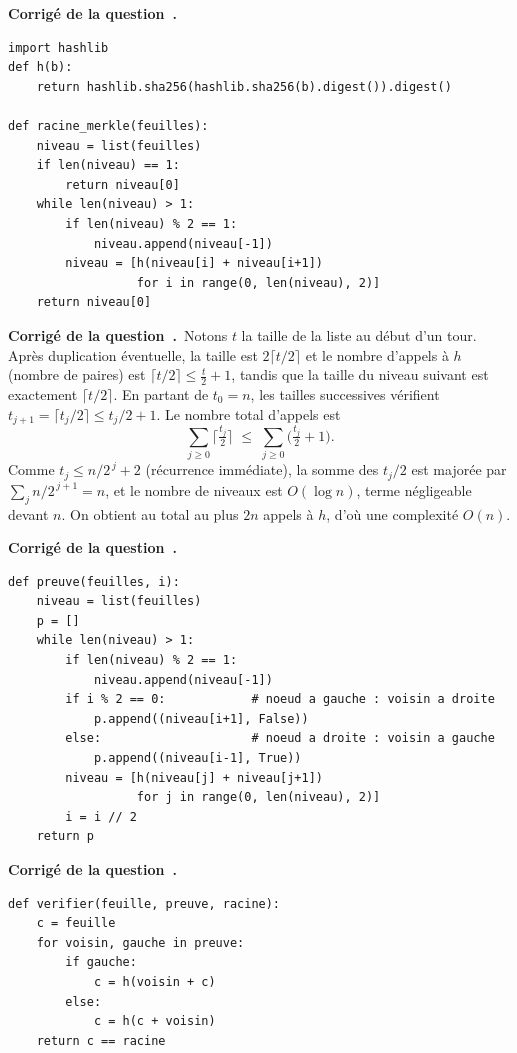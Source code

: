 \documentclass[11pt,a4paper]{article}
\newcounter{qcnt}
\newcommand{\Q}{\medskip\par\stepcounter{qcnt}\noindent\textbf{Corrigé de la question~\theqcnt.}~}
\begin{document}
\Q
\begin{lstlisting}
import hashlib
def h(b):
    return hashlib.sha256(hashlib.sha256(b).digest()).digest()

def racine_merkle(feuilles):
    niveau = list(feuilles)
    if len(niveau) == 1:
        return niveau[0]
    while len(niveau) > 1:
        if len(niveau) % 2 == 1:
            niveau.append(niveau[-1])
        niveau = [h(niveau[i] + niveau[i+1])
                  for i in range(0, len(niveau), 2)]
    return niveau[0]
\end{lstlisting}

\Q Notons $t$ la taille de la liste au début d'un tour. Après duplication éventuelle, la taille est $2\lceil t/2\rceil$ et le nombre d'appels à $h$ (nombre de paires) est $\lceil t/2\rceil \le \tfrac{t}{2}+1$, tandis que la taille du niveau suivant est exactement $\lceil t/2\rceil$. En partant de $t_0=n$, les tailles successives vérifient $t_{j+1}=\lceil t_j/2\rceil \le t_j/2 + 1$. Le nombre total d'appels est
\[
  \sum_{j\ge 0}\Big\lceil \tfrac{t_j}{2}\Big\rceil
  \;\le\; \sum_{j\ge 0}\Big(\tfrac{t_j}{2}+1\Big).
\]
Comme $t_j \le n/2^{\,j}+2$ (récurrence immédiate), la somme des $t_j/2$ est majorée par $\sum_j n/2^{\,j+1} = n$, et le nombre de niveaux est $O(\log n)$, terme négligeable devant $n$. On obtient au total au plus $2n$ appels à $h$, d'où une complexité $O(n)$.

\Q
\begin{lstlisting}
def preuve(feuilles, i):
    niveau = list(feuilles)
    p = []
    while len(niveau) > 1:
        if len(niveau) % 2 == 1:
            niveau.append(niveau[-1])
        if i % 2 == 0:            # noeud a gauche : voisin a droite
            p.append((niveau[i+1], False))
        else:                     # noeud a droite : voisin a gauche
            p.append((niveau[i-1], True))
        niveau = [h(niveau[j] + niveau[j+1])
                  for j in range(0, len(niveau), 2)]
        i = i // 2
    return p
\end{lstlisting}

\Q
\begin{lstlisting}
def verifier(feuille, preuve, racine):
    c = feuille
    for voisin, gauche in preuve:
        if gauche:
            c = h(voisin + c)
        else:
            c = h(c + voisin)
    return c == racine
\end{lstlisting}
\end{document}
